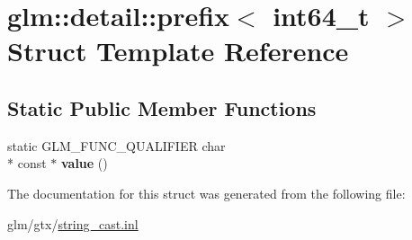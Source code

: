\hypertarget{structglm_1_1detail_1_1prefix_3_01int64__t_01_4}{\section{glm\-:\-:detail\-:\-:prefix$<$ int64\-\_\-t $>$ Struct Template Reference}
\label{structglm_1_1detail_1_1prefix_3_01int64__t_01_4}
}
\subsection*{Static Public Member Functions}
\begin{DoxyCompactItemize}
\item 
\hypertarget{structglm_1_1detail_1_1prefix_3_01int64__t_01_4_a845043fc18700790972ca73ebc80ac4d}{static G\-L\-M\-\_\-\-F\-U\-N\-C\-\_\-\-Q\-U\-A\-L\-I\-F\-I\-E\-R char \\*
const $\ast$ {\bfseries value} ()}\label{structglm_1_1detail_1_1prefix_3_01int64__t_01_4_a845043fc18700790972ca73ebc80ac4d}

\end{DoxyCompactItemize}


The documentation for this struct was generated from the following file\-:\begin{DoxyCompactItemize}
\item 
glm/gtx/\hyperlink{string__cast_8inl}{string\-\_\-cast.\-inl}\end{DoxyCompactItemize}
